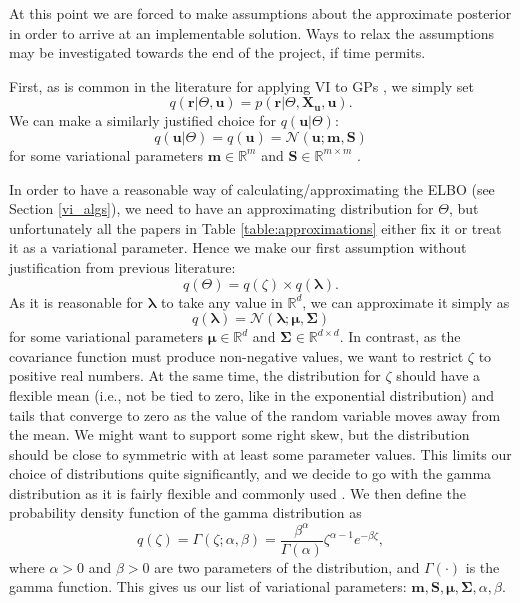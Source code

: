 \documentclass{mprop}
\theoremstyle{definition}
\begin{document}
At this point we are forced to make assumptions about the approximate posterior
in order to arrive at an implementable solution. Ways to relax the assumptions
may be investigated towards the end of the project, if time permits.

First, as is common in the literature for applying VI to GPs
\cite{DBLP:conf/nips/ChengB17,DBLP:conf/uai/HensmanFL13,DBLP:conf/icml/HoangHL15,DBLP:journals/jmlr/Titsias09},
we simply set
\[ q(\mathbf{r} | \Theta, \mathbf{u}) = p(\mathbf{r} | \Theta, \mathbf{X_u},
  \mathbf{u}). \]
We can make a similarly justified choice for $q(\mathbf{u} | \Theta)$:
\[ q(\mathbf{u} | \Theta) = q(\mathbf{u}) = \mathcal{N}(\mathbf{u}; \mathbf{m}, \mathbf{S}) \]
for some variational parameters $\mathbf{m} \in \mathbb{R}^{m}$ and $\mathbf{S}
\in \mathbb{R}^{m \times m}$
\cite{DBLP:conf/nips/ChengB17,DBLP:journals/jmlr/HensmanDS17,DBLP:conf/aaai/HoangHL17}.

In order to have a reasonable way of calculating/approximating the ELBO (see
Section \ref{vi_algs}), we need to have an approximating distribution for
$\Theta$, but unfortunately all the papers in Table \ref{table:approximations}
either fix it or treat it as a variational parameter. Hence we make our first
assumption without justification from previous literature:
\[ q(\Theta) = q(\zeta) \times q(\bm\lambda). \]
As it is reasonable for $\bm\lambda$ to take any value in $\mathbb{R}^d$, we can
approximate it simply as
\[ q(\bm\lambda) = \mathcal{N}(\bm\lambda; \bm\mu, \bm\Sigma) \]
for some variational parameters $\bm\mu \in \mathbb{R}^d$ and $\bm\Sigma \in
\mathbb{R}^{d \times d}$. In contrast, as the covariance function must produce
non-negative values, we want to restrict $\zeta$ to positive real numbers. At
the same time, the distribution for $\zeta$ should have a flexible mean (i.e.,
not be tied to zero, like in the exponential distribution) and tails that
converge to zero as the value of the random variable moves away from the mean.
We might want to support some right skew, but the distribution should be close
to symmetric with at least some parameter values. This limits our choice of
distributions quite significantly, and we decide to go with the gamma
distribution as it is fairly flexible and commonly used
\cite{hogg2018introduction}. We then define the probability density function of
the gamma distribution as
\[ q(\zeta) = \Gamma(\zeta; \alpha, \beta) =
  \frac{\beta^\alpha}{\Gamma(\alpha)}\zeta^{\alpha - 1}e^{-\beta\zeta}, \]
where $\alpha > 0$ and $\beta > 0$ are two parameters of the distribution, and
$\Gamma(\cdot)$ is the gamma function. This gives us our list of variational
parameters: $\mathbf{m}, \mathbf{S}, \bm\mu, \bm\Sigma, \alpha, \beta$.
\end{document}

